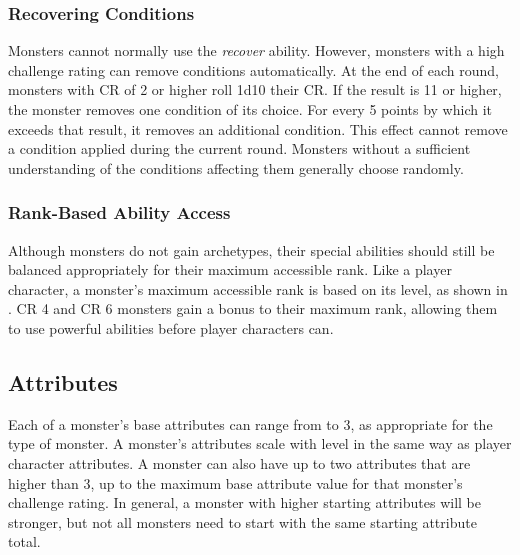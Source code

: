        \subsubsection{Recovering Conditions}
            Monsters cannot normally use the \textit{recover} ability.
            However, monsters with a high challenge rating can remove conditions automatically.
            At the end of each round, monsters with CR of 2 or higher roll 1d10 \add their CR.
            If the result is 11 or higher, the monster removes one condition of its choice.
            For every 5 points by which it exceeds that result, it removes an additional condition.
            This effect cannot remove a condition applied during the current round.
            Monsters without a sufficient understanding of the conditions affecting them generally choose randomly.

        \subsubsection{Rank-Based Ability Access}
            Although monsters do not gain archetypes, their special abilities should still be balanced appropriately for their maximum accessible rank.
            Like a player character, a monster's maximum accessible rank is based on its level, as shown in .
            CR 4 and CR 6 monsters gain a  bonus to their maximum rank, allowing them to use powerful abilities before player characters can.

    \subsection{Attributes}
        Each of a monster's base attributes can range from  to 3, as appropriate for the type of monster.
        A monster's attributes scale with level in the same way as player character attributes.
        A monster can also have up to two attributes that are higher than 3, up to the maximum base attribute value for that monster's challenge rating.
        In general, a monster with higher starting attributes will be stronger, but not all monsters need to start with the same starting attribute total.

